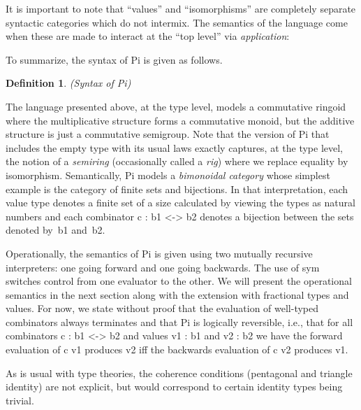 \documentclass{sigplanconf}
\newtheorem{definition}[theorem]{Definition}
\begin{document}
It is important to note that ``values'' and ``isomorphisms'' are completely
separate syntactic categories which do not intermix. The semantics of the
language come when these are made to interact at the ``top level'' via
\emph{application}: 

\noindent
To summarize, the syntax of {{Pi}} is given as follows. 

\begin{definition}{(Syntax of {{Pi}})}
\label{def:Pi}
%
\end{definition}

The language presented above, at the type level, models a commutative ringoid
where the multiplicative structure forms a commutative monoid, but the
additive structure is just a commutative semigroup.  Note that the version of
{{Pi}} that includes the empty type with its usual laws exactly captures, at
the type level, the notion of a \emph{semiring} (occasionally called a
\emph{rig}) where we replace equality by isomorphism.  Semantically, {{Pi}}
models a \emph{bimonoidal category} whose simplest example is the category of
finite sets and bijections. In that interpretation, each value type denotes a
finite set of a size calculated by viewing the types as natural numbers and
each combinator {{c : b1 <-> b2}} denotes a bijection between the sets
denoted by~{{b1}} and~{{b2}}. 

Operationally, the semantics of {{Pi}} is given using two mutually recursive
interpreters: one going forward and one going backwards. The use of {{sym}}
switches control from one evaluator to the other. We will present the
operational semantics in the next section along with the extension with
fractional types and values. For now, we state without proof that the
evaluation of well-typed combinators always terminates and that {{Pi}} is
logically reversible, i.e., that for all combinators {{c : b1 <-> b2}} and
values {{v1 : b1}} and {{v2 : b2}} we have the forward evaluation of {{c v1}}
produces {{v2}} iff the backwards evaluation of {{c v2}} produces {{v1}}.

As is usual with type theories, the coherence conditions (pentagonal and
triangle identity) are not explicit, but would correspond to certain identity
types being trivial.
\end{document}
